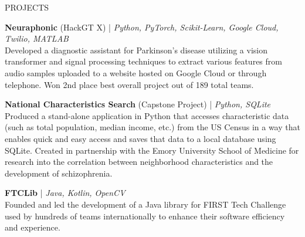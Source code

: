 \documentclass{resume} %
\begin{document}

\vspace{-0.8em}
\begin{rSection}{PROJECTS}
\vspace{-1.25em}
\item \textbf{Neuraphonic} (HackGT X) | \textit{Python, PyTorch, Scikit-Learn, Google Cloud, Twilio, MATLAB} \\
Developed a diagnostic assistant for Parkinson's disease utilizing a vision transformer and signal processing techniques to extract
various features from audio samples uploaded to a website hosted on Google Cloud or through telephone. Won 2nd place best overall project
out of 189 total teams.
\vspace{-0.5em}
\item \textbf{National Characteristics Search} (Capstone Project) | \textit{Python, SQLite}\\
Produced a stand-alone application in Python that accesses characteristic data (such as total population, median income, etc.)
from the US Census in a way that enables quick and easy access and saves that data to a local database using
SQLite. Created in partnership with the Emory University School of Medicine for research into the correlation between
neighborhood characteristics and the development of schizophrenia.
\vspace{-0.5em}
\item \textbf{FTCLib} | \textit{Java, Kotlin, OpenCV}\\
Founded and led the development of a Java library for FIRST Tech Challenge used by hundreds of teams internationally
to enhance their software efficiency and experience.
\end{rSection}
\end{document}
